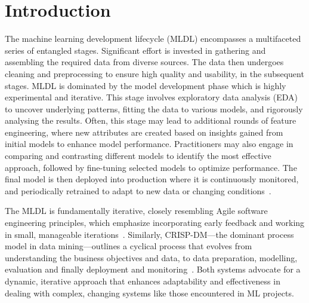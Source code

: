 \documentclass[smallextended]{svjour3}       %
\begin{document}

\section{Introduction}

The machine learning development lifecycle (MLDL) encompasses a multifaceted series of entangled stages. Significant effort is invested in gathering and assembling the required data from diverse sources. The data then undergoes cleaning and preprocessing to ensure high quality and usability, in the subsequent stages. MLDL is dominated by the model development phase which is highly experimental and iterative. This stage involves exploratory data analysis (EDA) to uncover underlying patterns, fitting the data to various models, and rigorously analysing the results. Often, this stage may lead to additional rounds of feature engineering, where new attributes are created based on insights gained from initial models to enhance model performance. Practitioners may also engage in comparing and contrasting different models to identify the most effective approach, followed by fine-tuning selected models to optimize performance. The final model is then deployed into production where it is continuously monitored, and periodically retrained to adapt to new data or changing conditions~\citep{haakman2021ai,amershi2019software,sculley2015hidden}.

The MLDL is fundamentally iterative, closely resembling Agile software engineering principles, which emphasize incorporating early feedback and working in small, manageable iterations~\citep{betz2018managing}. Similarly, CRISP-DM---the dominant process model in data mining---outlines a cyclical process that evolves from understanding the business objectives and data, to data preparation, modelling, evaluation and finally deployment and monitoring~\citep{martinez-plumed2021crisp-dm}. Both systems advocate for a dynamic, iterative approach that enhances adaptability and effectiveness in dealing with complex, changing systems like those encountered in ML projects.
\end{document}

